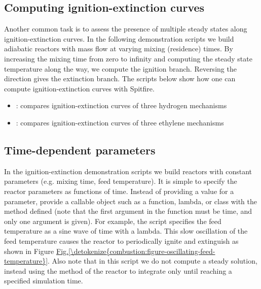 \documentclass[letterpaper,10pt,english]{sphinxmanual}
\begin{document}
\subsection{Computing ignition-extinction curves}
\label{\detokenize{combustion:computing-ignition-extinction-curves}}
Another common task is to assess the presence of multiple steady states along ignition-extinction curves.
In the following demonstration scripts we build adiabatic reactors with mass flow at varying mixing (residence) times.
By increasing the mixing time from zero to infinity and computing the steady state temperature along the way, we compute the ignition branch.
Reversing the direction gives the extinction branch.
The scripts below show how one can compute ignition-extinction curves with Spitfire.
\begin{itemize}
\item {} 
: compares ignition-extinction curves of three hydrogen mechanisms

\item {} 
: compares ignition-extinction curves of three ethylene mechanisms

\end{itemize}


\subsection{Time-dependent parameters}
\label{\detokenize{combustion:time-dependent-parameters}}
In the ignition-extinction demonstration scripts we build reactors with constant parameters (e.g. mixing time, feed temperature).
It is simple to specify the reactor parameters as functions of time.
Instead of providing a value for a parameter, provide a callable object such as a function, lambda, or class with the  method defined (note that the first argument in the function must be time, and only one argument is given).
For example, the  script specifies the feed temperature as a sine wave of time with a lambda.
This slow oscillation of the feed temperature causes the reactor to periodically ignite and extinguish as shown in Figure \hyperref[\detokenize{combustion:figure-oscillating-feed-temperature}]{Fig.\@ \ref{\detokenize{combustion:figure-oscillating-feed-temperature}}}.
Also note that in this script we do not compute a steady solution, instead using the  method of the reactor to integrate only until reaching a specified simulation time.
\end{document}
